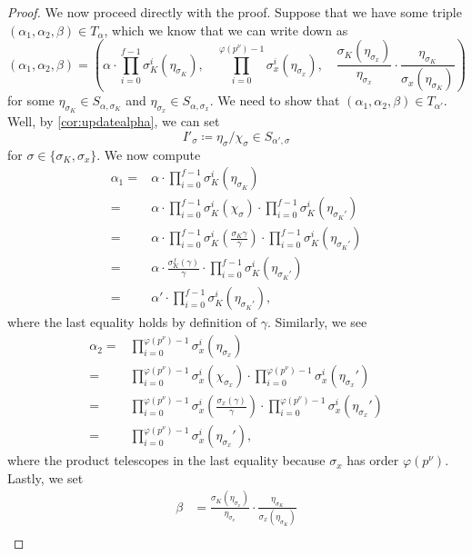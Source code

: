 \begin{proof}
	We now proceed directly with the proof. Suppose that we have some triple $(\alpha_1,\alpha_2,\beta)\in T_\alpha$, which we know that we can write down as
	\[(\alpha_1,\alpha_2,\beta)=\left(\alpha\cdot\prod_{i=0}^{f-1}\sigma_K^i\left(\eta_{\sigma_K}\right),\quad\prod_{i=0}^{\varphi\left(p^\nu\right)-1}\sigma_x^i\left(\eta_{\sigma_x}\right),\quad\frac{\sigma_K\left(\eta_{\sigma_x}\right)}{\eta_{\sigma_x}}\cdot\frac{\eta_{\sigma_K}}{\sigma_x\left(\eta_{\sigma_K}\right)}\right)\]
	for some $\eta_{\sigma_K}\in S_{\alpha,\sigma_K}$ and $\eta_{\sigma_x}\in S_{\alpha,\sigma_x}$. We need to show that $(\alpha_1,\alpha_2,\beta)\in T_{\alpha'}$. Well, by \autoref{cor:updatealpha}, we can set
	\[I'_{\sigma}\coloneqq \eta_{\sigma}/\chi_\sigma\in S_{\alpha',\sigma}\]
	for $\sigma\in\{\sigma_K,\sigma_x\}$. We now compute
	\begin{align*}
		\alpha_1 ={}& \alpha\cdot\prod_{i=0}^{f-1}\sigma_K^i(\eta_{\sigma_K}) \\
		={}& \alpha\cdot\prod_{i=0}^{f-1}\sigma_K^i(\chi_\sigma)\cdot\prod_{i=0}^{f-1}\sigma_K^i(\eta_{\sigma_K'}) \\
		={}& \alpha\cdot\prod_{i=0}^{f-1}\sigma_K^i\left(\frac{\sigma_K\gamma}{\gamma}\right)\cdot\prod_{i=0}^{f-1}\sigma_K^i(\eta_{\sigma_K'}) \\
		={}& \alpha\cdot\frac{\sigma_K^f(\gamma)}{\gamma}\cdot\prod_{i=0}^{f-1}\sigma_K^i(\eta_{\sigma_K'}) \\
		={}& \alpha'\cdot\prod_{i=0}^{f-1}\sigma_K^i(\eta_{\sigma_K'}),
	\end{align*}
	where the last equality holds by definition of $\gamma$. Similarly, we see
	\begin{align*}
		\alpha_2 ={}& \prod_{i=0}^{\varphi\left(p^\nu\right)-1}\sigma_x^i(\eta_{\sigma_x}) \\
		={}& \prod_{i=0}^{\varphi\left(p^\nu\right)-1}\sigma_x^i(\chi_{\sigma_x})\cdot\prod_{i=0}^{\varphi\left(p^\nu\right)-1}\sigma_x^i(\eta_{\sigma_x}') \\
		={}& \prod_{i=0}^{\varphi\left(p^\nu\right)-1}\sigma_x^i\left(\frac{\sigma_x(\gamma)}{\gamma}\right)\cdot\prod_{i=0}^{\varphi\left(p^\nu\right)-1}\sigma_x^i(\eta_{\sigma_x}') \\
		={}& \prod_{i=0}^{\varphi\left(p^\nu\right)-1}\sigma_x^i(\eta_{\sigma_x}'),
	\end{align*}
	where the product telescopes in the last equality because $\sigma_x$ has order $\varphi\left(p^\nu\right)$. Lastly, we set
	\begin{align*}
		\beta &= \frac{\sigma_K\left(\eta_{\sigma_x}\right)}{\eta_{\sigma_x}}\cdot\frac{\eta_{\sigma_K}}{\sigma_x\left(\eta_{\sigma_K}\right)} \\

\end{align*}
\end{proof}
